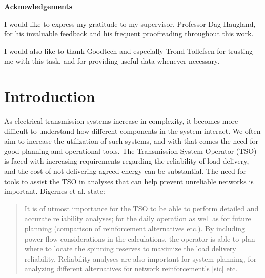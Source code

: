 \documentclass[a4paper,12pt]{report}
\makeatletter
\newcommand\ackname{Acknowledgements}
\newenvironment{acknowledgements}{%
      \titlepage
      \null\vfil
      \@beginparpenalty\@lowpenalty
      \begin{center}%
        \bfseries \ackname
        \@endparpenalty\@M
      \end{center}}%
     {\par\vfil\null\endtitlepage}
\newenvironment{acknowledgements}{%
      \if@twocolumn
        \section*{\abstractname}%
      \else
        \small
        \begin{center}%
          {\bfseries \ackname\vspace{-.5em}\vspace{\z@}}%
        \end{center}%
        \quotation
      \fi}
      {\if@twocolumn\else\endquotation\fi}
\makeatother
\begin{document}
\thispagestyle{empty}
\begin{acknowledgements}
I would like to express my gratitude to my supervisor, Professor Dag Haugland, for his
invaluable feedback and his frequent proofreading throughout this work.

I would also like to thank Goodtech and especially Trond Tollefsen for trusting
me with this task, and for providing useful data whenever necessary.
\end{acknowledgements}

\thispagestyle{empty}

\setcounter{page}{4}
\tableofcontents
\newpage

\chapter{Introduction}
\label{ch:intro}
As electrical transmission systems increase in complexity, it becomes
more difficult to understand how different components in the system interact.
We often aim to increase the utilization of such systems, and with that comes
the need for good planning and operational tools.
The Transmission System Operator (TSO) is faced
with increasing requirements regarding the reliability of load
delivery, and the cost of not delivering agreed energy can be
substantial.
The need for tools to assist the TSO in analyses that can help prevent
unreliable networks is important.
Digernes et al. \cite{digernes} state:
\begin{quote}
It is of utmost importance for the TSO to be able to perform detailed and
accurate reliability analyses; for the daily operation as well as for
future planning (comparison of reinforcement alternatives etc.). By
including power flow considerations in the calculations, the operator is
able to plan where to locate the spinning reserves to maximize the load
delivery reliability. Reliability analyses are also important for system
planning, for analyzing different alternatives for network reinforcement's
[sic] etc.\cite{digernes}
\end{quote}
\end{document}
